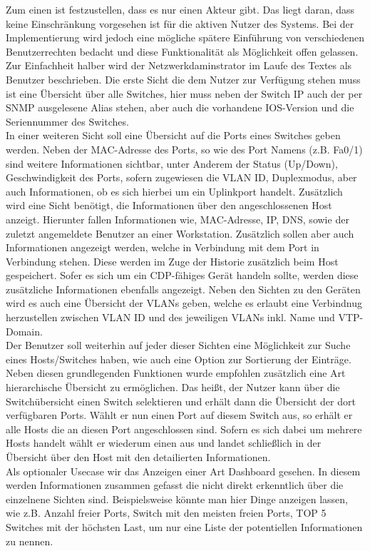 Zum einen ist festzustellen, dass es nur einen Akteur gibt. Das liegt daran, dass keine Einschränkung vorgesehen ist für die aktiven Nutzer des Systems. Bei der Implementierung wird jedoch eine mögliche spätere Einführung von verschiedenen Benutzerrechten bedacht und diese Funktionalität als Möglichkeit offen gelassen. Zur Einfachheit halber wird der Netzwerkdaminstrator im Laufe des Textes als Benutzer beschrieben.
Die erste Sicht die dem Nutzer zur Verfügung stehen muss ist eine Übersicht über alle Switches, hier muss neben der Switch IP auch der per SNMP ausgelesene Alias stehen, aber auch die vorhandene IOS-Version und die Seriennummer des Switches.\\
In einer weiteren Sicht soll eine Übersicht auf die Ports eines Switches geben werden.
Neben der MAC-Adresse des Ports, so wie des Port Namens (z.B. Fa0/1) sind weitere Informationen sichtbar, unter Anderem der Status (Up/Down), Geschwindigkeit des Ports, sofern zugewiesen die VLAN ID, Duplexmodus, aber auch Informationen, ob es sich hierbei um ein Uplinkport handelt.
Zusätzlich wird eine Sicht benötigt, die Informationen über den angeschlossenen Host anzeigt. Hierunter fallen Informationen wie, MAC-Adresse, IP, DNS, sowie der zuletzt angemeldete Benutzer an einer Workstation. Zusätzlich sollen aber auch Informationen angezeigt werden, welche in Verbindung mit dem Port in Verbindung stehen. Diese werden im Zuge der Historie zusätzlich beim Host gespeichert. Sofer es sich um ein CDP-fähiges Gerät handeln sollte, werden diese zusätzliche Informationen ebenfalls angezeigt.
Neben den Sichten zu den Geräten wird es auch eine Übersicht der VLANs geben, welche es erlaubt eine Verbindnug herzustellen zwischen VLAN ID und des jeweiligen VLANs inkl. Name und  VTP-Domain.\\
Der Benutzer soll weiterhin auf jeder dieser Sichten eine Möglichkeit zur Suche eines Hosts/Switches haben, wie auch eine Option zur Sortierung der Einträge.
Neben diesen grundlegenden Funktionen wurde empfohlen zusätzlich eine Art hierarchische Übersicht zu ermöglichen. Das heißt, der Nutzer kann über die Switchübersicht einen Switch selektieren und erhält dann die Übersicht der dort verfügbaren Ports. Wählt er nun einen Port auf diesem Switch aus, so erhält er alle Hosts die an diesen Port angeschlossen sind. Sofern es sich dabei um mehrere Hosts handelt wählt er wiederum einen aus und landet schließlich in der Übersicht über den Host mit den detailierten Informationen.\\
Als optionaler Usecase wir das Anzeigen einer Art Dashboard gesehen. In diesem werden Informationen zusammen gefasst die nicht direkt erkenntlich über die einzelnene Sichten sind. Beispielsweise könnte man hier Dinge anzeigen lassen, wie z.B. Anzahl freier Ports, Switch mit den meisten freien Ports, TOP 5 Switches mit der höchsten Last, um nur eine Liste der potentiellen Informationen zu nennen.

